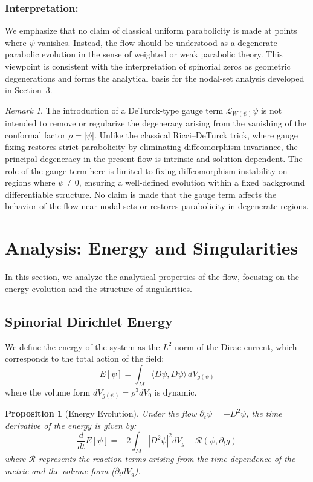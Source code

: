 \documentclass[11pt, reqno, a4paper]{amsart}
\newtheorem{proposition}[theorem]{Proposition}
\theoremstyle{definition}
\theoremstyle{remark}
\newtheorem{remark}[theorem]{Remark}
\begin{document}
\subsubsection{\textbf{Interpretation}:}
We emphasize that no claim of classical uniform parabolicity is made at points where
$\psi$ vanishes. Instead, the flow should be understood as a degenerate parabolic
evolution in the sense of weighted or weak parabolic theory.
This viewpoint is consistent with the interpretation of spinorial zeros as geometric degenerations and forms the analytical basis for the nodal-set analysis developed in Section~3.

\begin{remark}
    The introduction of a DeTurck-type gauge term $\mathcal{L}_{W(\psi)}\psi$ is not intended to remove or regularize the degeneracy arising from the vanishing of the conformal factor
$\rho = |\psi|$.
Unlike the classical Ricci--DeTurck trick, where gauge fixing restores strict
parabolicity by eliminating diffeomorphism invariance, the principal
degeneracy in the present flow is intrinsic and solution-dependent.
The role of the gauge term here is limited to fixing diffeomorphism
instability on regions where $\psi \neq 0$, ensuring a well-defined evolution
within a fixed background differentiable structure.
No claim is made that the gauge term affects the behavior of the flow near
nodal sets or restores parabolicity in degenerate regions.
\end{remark}

\section{Analysis: Energy and Singularities}

In this section, we analyze the analytical properties of the flow, focusing on the energy evolution and the structure of singularities.

\subsection{Spinorial Dirichlet Energy}
We define the energy of the system as the $L^2$-norm of the Dirac current, which corresponds to the total action of the field:
\begin{equation}
    E[\psi] = \int_M \langle D \psi, D \psi \rangle \, dV_{g(\psi)}
\end{equation}
where the volume form $dV_{g(\psi)} = \rho^3 dV_0$ is dynamic.

\begin{proposition}[Energy Evolution]
Under the flow $\partial_t \psi = -D^2 \psi$, the time derivative of the energy is given by:
\begin{equation}
    \frac{d}{dt} E[\psi] = -2 \int_M |D^2 \psi|^2 dV_g + \mathcal{R}(\psi, \partial_t g)
\end{equation}
where $\mathcal{R}$ represents the reaction terms arising from the time-dependence of the metric and the volume form ($\partial_t dV_g$).
\end{proposition}
\end{document}

